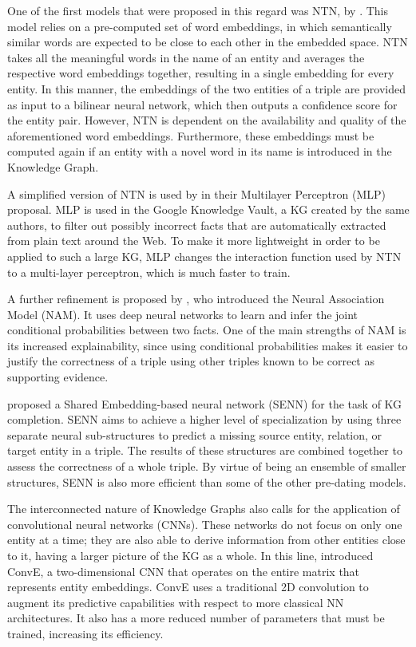 One of the first models that were proposed in this regard was NTN, by \citet{socher2013}. This model relies on a pre-computed set of word embeddings, in which semantically similar words are expected to be close to each other in the embedded space. NTN takes all the meaningful words in the name of an entity and averages the respective word embeddings together, resulting in a single embedding for every entity. In this manner, the embeddings of the two entities of a triple are provided as input to a bilinear neural network, which then outputs a confidence score for the entity pair. However, NTN is dependent on the availability and quality of the aforementioned word embeddings. Furthermore, these embeddings must be computed again if an entity with a novel word in its name is introduced in the Knowledge Graph. 

A simplified version of NTN is used by \citet{dong2014} in their Multilayer Perceptron (MLP) proposal. MLP is used in the Google Knowledge Vault, a KG created by the same authors, to filter out possibly incorrect facts that are automatically extracted from plain text around the Web. To make it more lightweight in order to be applied to such a large KG, MLP changes the interaction function used by NTN to a multi-layer perceptron, which is much faster to train.

A further refinement is proposed by \citet{liu2016}, who introduced the Neural Association Model (NAM). It uses deep neural networks to learn and infer the joint conditional probabilities between two facts. One of the main strengths of NAM is its increased explainability, since using conditional probabilities makes it easier to justify the correctness of a triple using other triples known to be correct as supporting evidence.

\citet{guan2018} proposed a Shared Embedding-based neural network (SENN) for the task of KG completion. SENN aims to achieve a higher level of specialization by using three separate neural sub-structures to predict a missing source entity, relation, or target entity in a triple. The results of these structures are combined together to assess the correctness of a whole triple. By virtue of being an ensemble of smaller structures, SENN is also more efficient than some of the other pre-dating models.

The interconnected nature of Knowledge Graphs also calls for the application of convolutional neural networks (CNNs). These networks do not focus on only one entity at a time; they are also able to derive information from other entities close to it, having a larger picture of the KG as a whole. In this line, \citet{dettmers2018} introduced ConvE, a two-dimensional CNN that operates on the entire matrix that represents entity embeddings. ConvE uses a traditional 2D convolution to augment its predictive capabilities with respect to more classical NN architectures. It also has a more reduced number of parameters that must be trained, increasing its efficiency.


